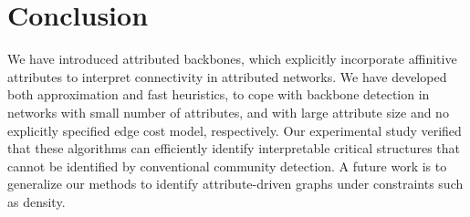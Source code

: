 \section {Conclusion}

We have introduced attributed backbones, 
which explicitly incorporate affinitive attributes 
to interpret connectivity in attributed networks. 
We have developed both approximation and 
fast heuristics, to cope with backbone detection 
in networks with small number of attributes, and 
with large attribute size and no explicitly specified 
edge cost model, respectively. 
Our experimental study verified that 
these algorithms can efficiently identify 
interpretable critical structures that 
cannot be identified by conventional 
community detection. 
A future work is to generalize 
our methods to identify 
attribute-driven graphs 
under constraints such as density.  

